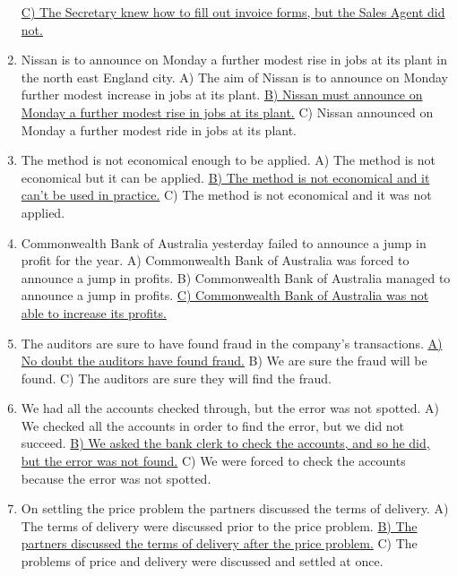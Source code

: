 \documentclass[main.tex]{subfiles}
\begin{document}
\begin{enumerate}[nosep, leftmargin=*]
		\uline{C) The Secretary knew how to fill out invoice forms, but the Sales Agent did not.}
	\item Nissan is to announce on Monday a further modest rise in jobs at its plant in the north east England city.\newline
		A) The aim of Nissan is to announce on Monday further modest increase in jobs at its plant.\newline
		\uline{B) Nissan must announce on Monday a further modest rise in jobs at its plant.}\newline
		C) Nissan announced on Monday a further modest ride in jobs at its plant.
	\item The method is not economical enough to be applied.\newline
		A) The method is not economical but it can be applied.\newline
		\uline{B) The method is not economical and it can't be used in practice.}\newline
		C) The method is not economical and it was not applied.
	\item Commonwealth Bank of Australia yesterday failed to announce a jump in profit for the year.\newline
		A) Commonwealth Bank of Australia was forced to announce a jump in profits.\newline
		B) Commonwealth Bank of Australia managed to announce a jump in profits.\newline
		\uline{C) Commonwealth Bank of Australia was not able to increase its profits.}
	\item The auditors are sure to have found fraud in the company's transactions.\newline
		\uline{A) No doubt the auditors have found fraud.}\newline
		B) We are sure the fraud will be found.\newline
		C) The auditors are sure they will find the fraud.
	\item We had all the accounts checked through, but the error was not spotted.\newline
		A) We checked all the accounts in order to find the error, but we did not succeed.\newline
		\uline{B) We asked the bank clerk to check the accounts, and so he did, but the error was not found.}\newline
		C) We were forced to check the accounts because the error was not spotted.
	\item On settling the price problem the partners discussed the terms of delivery.\newline
		A) The terms of delivery were discussed prior to the price problem.\newline
		\uline{B) The partners discussed the terms of delivery after the price problem.}\newline
		C) The problems of price and delivery were discussed and settled at once.
\end{enumerate}
\ 
\end{document}
